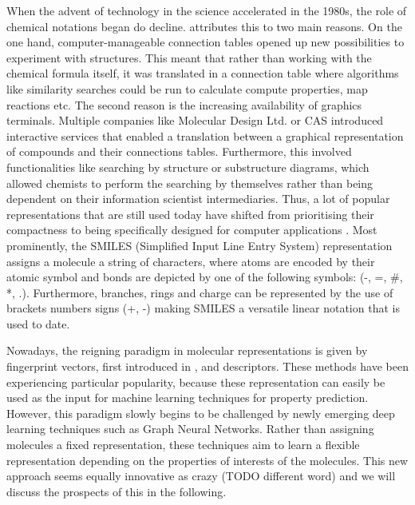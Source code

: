 When the advent of technology in the science accelerated in the 1980s, the role of chemical notations began do decline. \citep{Lawlor} attributes this to two main reasons. On the one hand, computer-manageable connection tables opened up new possibilities to experiment with structures. This meant that rather than working with the chemical formula itself, it was translated in a connection table where algorithms like similarity searches could be run to calculate compute properties, map reactions etc. 
The second reason is the increasing availability of graphics terminals. Multiple companies like Molecular Design Ltd. or CAS \citep{cas} introduced interactive services that enabled a translation between a graphical representation of compounds and their connections tables. Furthermore, this involved functionalities like searching by structure or substructure diagrams, which allowed chemists to perform the searching by themselves rather than being dependent on their information scientist intermediaries. Thus, a lot of popular representations that are still used today have shifted from prioritising their compactness to being specifically designed for computer applications \citep{smiles, heller2015inchi, cereto2015molecular}. Most prominently, the SMILES (Simplified Input Line Entry System) representation \citep{smiles} assigns a molecule a string of characters, where atoms are encoded by their atomic symbol and bonds are depicted by one of the following symbols: (-, =, \#, *, .). Furthermore, branches, rings and charge can be represented by the use of brackets numbers signs (+, -) making SMILES a versatile linear notation that is used to date. 

Nowadays, the reigning paradigm in molecular representations is given by fingerprint vectors, first introduced in , and descriptors. These methods have been experiencing particular popularity, because these representation can easily be used as the input for machine learning techniques for property prediction. However, this paradigm slowly begins to be challenged by newly emerging deep learning techniques such as Graph Neural Networks.
Rather than assigning molecules a fixed representation, these techniques aim to learn a flexible representation depending on the properties of interests of the molecules. This new approach seems equally innovative as crazy (TODO different word) and we will discuss the prospects of this in the following. 
